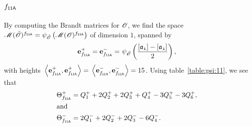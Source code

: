 \subsection{$f_\mathsf{{11A}}$}
By computing the Brandt matrices for ${\mathscr{O}}$,
we find the space $\operatorname{{\mathscr M}}({\tilde{{\mathscr{O}}}})^{f_\mathsf{{11A}}}
=\psi_{{\tilde{{\mathscr{O}}}}}\left(\operatorname{{\mathscr M}}({\mathscr{O}})^{f_\mathsf{{11A}}}\right)
$
of dimension $1$, spanned by
\begin{align*}
  \e{\mf{11A}}^+ = \e{\mf{11A}}^- = &\ \psi_{\Ot}\left(\frac{\cls{a_{1}}-\cls{a_{2}}}{2}\right),\\
\end{align*}
with heights $\,\<\e{\mf{11A}}^+,\e{\mf{11A}}^+>=\,\<\e{\mf{11A}}^-,\e{\mf{11A}}^->=15$.
Using table~\ref{table:psi:11},
we see that
\begin{align*}
  {\Theta}^+_{f_\mathsf{{11A}}} & =  Q_{1}^{+} + 2Q_{2}^{+} + 2Q_{3}^{+} + Q_{4}^{+} - 3Q_{5}^{+} - 3Q_{6}^{+}, \\
\intertext{and}
  {\Theta}^-_{f_\mathsf{{11A}}} & =  2Q_{1}^{-} + 2Q_{2}^{-} + 2Q_{3}^{-} - 6Q_{4}^{-}. \\
\end{align*}
